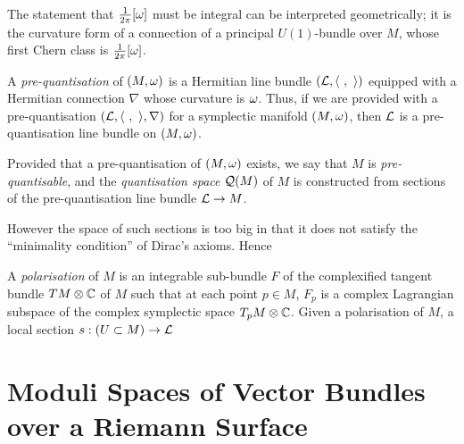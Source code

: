 The statement that $\tfrac{1}{2\pi}[\omega]$ must be integral can be interpreted geometrically; it is the curvature form of a connection of a principal $U(1)$-bundle over $M$, whose first Chern class is $\tfrac{1}{2\pi}[\omega]$.

\begin{defn}
	A \emph{pre-quantisation} of $(M,\omega)$ is a Hermitian line bundle $(\mathcal{L}, \langle\ ,\ \rangle)$ equipped with a Hermitian connection $\nabla$ whose curvature is $\omega$. Thus, if we are provided with a pre-quantisation $(\mathcal{L}, \langle\ ,\ \rangle, \nabla)$ for a symplectic manifold $(M,\omega)$, then $\mathcal{L}$ is a pre-quantisation line bundle on $(M,\omega)$.
\end{defn}

Provided that a pre-quantisation of $(M,\omega)$ exists, we say that $M$ is \emph{pre-quantisable}, and the \emph{quantisation space} $\mathcal{Q}(M)$ of $M$ is constructed from sections of the pre-quantisation line bundle $\mathcal{L} \rightarrow M$.

However the space of such sections is too big in that it does not satisfy the ``minimality condition'' of Dirac's axioms. Hence 

\begin{defn}
	A \emph{polarisation} of $M$ is an integrable sub-bundle $F$ of the complexified tangent bundle $TM\otimes \mathbb{C}$ of $M$ such that at each point $p \in M$, $F_{p}$ is a complex Lagrangian subspace of the complex symplectic space $T_{p}M \otimes \mathbb{C}$. Given a polarisation of $M$, a local section $s:(U \subset M) \rightarrow \mathcal{L}$
\end{defn}

































\newpage

\section{Moduli Spaces of Vector Bundles over a Riemann Surface}

